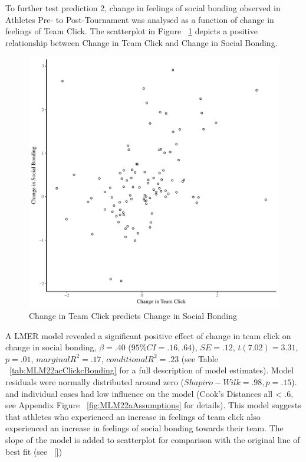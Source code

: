 \begin{CJK}{UTF8}{gbsn}
To further test prediction 2, change in feelings of social bonding observed in Athletes Pre- to Post-Tournament was analysed as a function of change in feelings of Team Click. The scatterplot in Figure ~\ref{fig:clickBondDeltaBasicXY} depicts a positive relationship between Change in Team Click and Change in Social Bonding.

    \begin{figure}[htbp]
      \centering
    \includegraphics[scale=.5]{images/clickBondDeltaBasicXY.pdf}
      \caption{Change in Team Click predicts Change in Social Bonding}
      \label{fig:clickBondDeltaBasicXY}
    \end{figure}

A LMER model revealed a significant positive effect of change in team click on change in social bonding, $\beta = .40$ ($95\% CI =  .16, .64$), $SE = .12$, $t(7.02) = 3.31$, $p = .01$, $marginal R^2 = .17$, $conditional R^2 = .23$ (see Table ~\ref{tab:MLM22acClickcBonding} for a full description of model estimates).  Model residuals were normally distributed around zero ($Shapiro-Wilk = .98, p = .15$). and individual cases had low influence on the model (Cook's Distances all < .6, see Appendix Figure ~\ref{fig:MLM22aAssumptions} for details). This model suggests that athletes who experienced an increase in feelings of team click also experienced an increase in feelings of social bonding towards their team.  The slope of the model is added to scatterplot for comparison with the original line of best fit (see ~\ref{})


\end{CJK}
